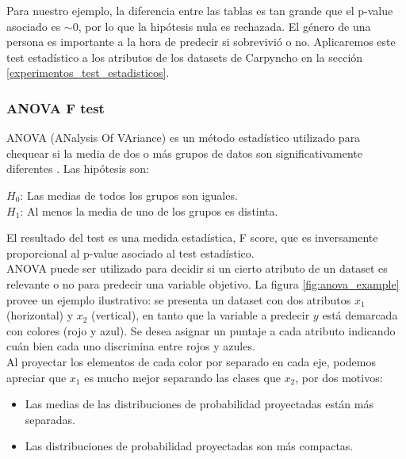 Para nuestro ejemplo, la diferencia entre las tablas es tan grande que el p-value asociado es $\sim0$, por lo que la hipótesis nula es rechazada. El género de una persona es importante a la hora de predecir si sobrevivió o no. Aplicaremos este test estadístico a los atributos de los datasets de Carpyncho en la sección \ref{experimentos_test_estadisticos}. \\

\subsubsection{ANOVA F test}
\label{f_test}
ANOVA (ANalysis Of VAriance) es un método estadístico utilizado para chequear si la media de dos o más grupos de datos son significativamente diferentes \cite{191611} \cite{han2012mining}. Las hipótesis son:\\

\begin{adjustwidth}{2cm}{}
\textbf{$H_0$}: Las medias de todos los grupos son iguales. \\
\textbf{$H_1$}: Al menos la media de uno de los grupos es distinta. \\
\end{adjustwidth}

El resultado del test es una medida estadística, F score, que es inversamente proporcional al p-value asociado al test estadístico. \\

ANOVA puede ser utilizado para decidir si un cierto atributo de un dataset es relevante o no para predecir una variable objetivo. La figura \ref{fig:anova_example} provee un ejemplo ilustrativo: se presenta un dataset con dos atributos $x_1$ (horizontal) y $x_2$ (vertical),  en tanto que la variable a predecir $y$ está demarcada con colores (rojo y azul). Se desea asignar un puntaje a cada atributo indicando cuán bien cada uno discrimina entre rojos y azules. \\

Al proyectar los elementos de cada color por separado en cada eje, podemos apreciar que $x_1$ es mucho mejor separando las clases que $x_2$, por dos motivos:

\begin{itemize}
\item Las medias de las distribuciones de probabilidad proyectadas están más separadas.
\item Las distribuciones de probabilidad proyectadas son más compactas.
\end{itemize}

